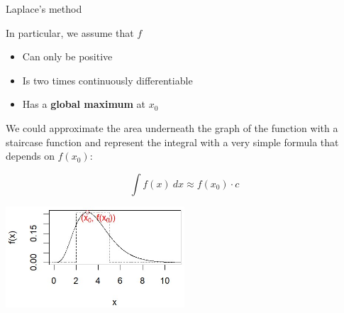 \begin{vbframe}{Laplace's method}










\framebreak
In particular, we assume that $f$

\begin{itemize}
\item Can only be positive
\item Is two times continuously differentiable
\item Has a \textbf{global maximum} at $x_0$
\end{itemize}


\vspace*{0.1cm}
We could approximate the area underneath the graph of the function with a staircase function and represent the integral with a very simple formula that depends on $f(x_0)$:
\vspace*{-0.1cm}
\begin{footnotesize}
$$
\int f(x)~dx \approx f(x_0) \cdot c
$$

\begin{center}
\includegraphics[width =0.5\textwidth]{figure_man/normaldist2.jpg}
\end{center}


\end{footnotesize}
\end{vbframe}

